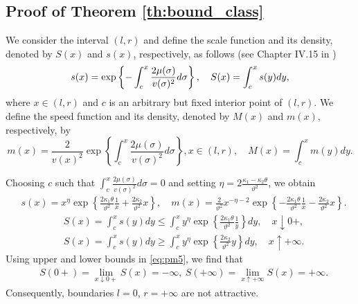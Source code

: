 \documentclass[pdftex,11pt,a4paper] {article}
\begin{document}
\subsection{Proof of Theorem \ref{th:bound_class}}\label{appx:bound_class_proof}
We consider the interval $(l,r)$ and define the scale function and its density, denoted by $S(x)$ and $s(x)$, respectively, as follows (see Chapter IV.15 in \cite{Bor})
\begin{equation} \label {eq:pm2}
s(x)=\exp\left\{-\int_c^x\frac{2\mu(\sigma)}{v(\sigma)^2}d\sigma\right\}, \quad 
S(x)=\int_c^x s(y)dy,\vspace*{-0.5\baselineskip}
\end{equation}
where $x\in (l,r)$ and $c$ is an arbitrary but fixed interior point of $(l,r)$. We define the speed function and its density, denoted by $M(x)$ and $m(x)$, respectively, by
\begin{equation} \label {eq:pm3}
m(x)=\frac{2}{v(x)^2}\exp\left\{\int_c^x\frac{2\mu(\sigma)}{v(\sigma)^2}d\sigma\right\}, x\in (l,r), \quad 
M(x)=\int_c^x m(y)dy.
\end{equation}

Choosing $c$ such that $\int_c^x\frac{2\mu(\sigma)}{v(\sigma)^2}d\sigma=0$ and setting $\eta=2\frac{\kappa_1-\kappa_2\theta}{\vartheta^2}$, we obtain
\begin{equation*}
\begin{split}
&s(x)=x^\eta\exp\left\{\frac{2\kappa_1\theta}{\vartheta^2}\frac{1}{x}+\frac{2\kappa_2}{\vartheta^2}x\right\}, \quad 
m(x)=\frac{2}{\vartheta^2}x^{-\eta-2}\exp\left\{-\frac{2\kappa_1\theta}{\vartheta^2}\frac{1}{x}-\frac{2\kappa_2}{\vartheta^2}x\right\}. 
\end{split}
\end{equation*}
\begin{equation}\label{eq:pm5}
\begin{split}
&S(x)=\int_c^xs(y)dy\le \int_c^xy^\eta\exp\left\{\frac{2\kappa_1\theta}{\vartheta^2}\frac{1}{y}\right\}dy,\quad x\downarrow 0+, \\
&S(x)=\int_c^xs(y)dy\ge \int_c^xy^\eta\exp\left\{\frac{2\kappa_2}{\vartheta^2}y\right\}dy, \quad x\uparrow +\infty.
\end{split}
\end{equation}
Using upper and lower bounds in \eqref{eq:pm5}, we find that
\begin{equation}
\begin{split}
&S(0+)=\lim_{x\downarrow 0+}S(x)=-\infty, \ S(+\infty)=\lim_{x\uparrow +\infty}S(x)=+\infty.
\end{split}
\end{equation}
Consequently, boundaries $l=0$, $r=+\infty$ are not attractive.
\end{document}
